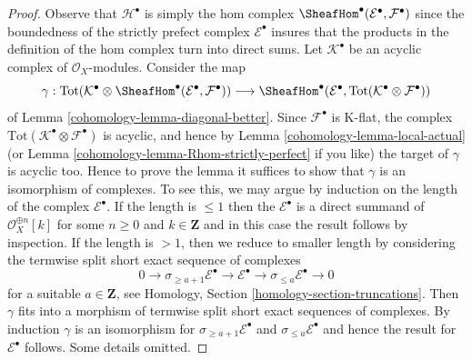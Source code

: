 \begin{proof}

Observe that $\mathcal{H}^\bullet$ is simply the hom complex
$\SheafHom^\bullet(\mathcal{E}^\bullet, \mathcal{F}^\bullet)$
since the boundedness of the strictly prefect complex
$\mathcal{E}^\bullet$ insures that the products in the definition
of the hom complex turn into direct sums.
Let $\mathcal{K}^\bullet$ be an acyclic complex of
$\mathcal{O}_X$-modules. Consider the map
$$
\gamma :
\text{Tot}(\mathcal{K}^\bullet \otimes
\SheafHom^\bullet(\mathcal{E}^\bullet, \mathcal{F}^\bullet))
\longrightarrow
\SheafHom^\bullet(\mathcal{E}^\bullet,
\text{Tot}(\mathcal{K}^\bullet \otimes \mathcal{F}^\bullet))
$$
of Lemma \ref{cohomology-lemma-diagonal-better}. Since $\mathcal{F}^\bullet$ is K-flat,
the complex $\text{Tot}(\mathcal{K}^\bullet \otimes \mathcal{F}^\bullet)$
is acyclic, and hence by Lemma \ref{cohomology-lemma-local-actual}
(or Lemma \ref{cohomology-lemma-Rhom-strictly-perfect} if you like)
the target of $\gamma$ is acyclic too. Hence to prove the lemma it suffices to
show that $\gamma$ is an isomorphism of complexes. To see this, we may argue
by induction on the length of the complex $\mathcal{E}^\bullet$.
If the length is $\leq 1$ then the $\mathcal{E}^\bullet$
is a direct summand of $\mathcal{O}_X^{\oplus n}[k]$ for some
$n \geq 0$ and $k \in \mathbf{Z}$ and in this case the result
follows by inspection. If the length is $> 1$, then we reduce
to smaller length by considering the termwise split short exact
sequence of complexes
$$
0 \to \sigma_{\geq a + 1} \mathcal{E}^\bullet \to
\mathcal{E}^\bullet \to
\sigma_{\leq a} \mathcal{E}^\bullet \to 0
$$
for a suitable $a \in \mathbf{Z}$, see
Homology, Section \ref{homology-section-truncations}.
Then $\gamma$ fits into a morphism of termwise split
short exact sequences of complexes.
By induction $\gamma$ is an isomorphism for
$\sigma_{\geq a + 1} \mathcal{E}^\bullet$
and $\sigma_{\leq a} \mathcal{E}^\bullet$ and hence the result for
$\mathcal{E}^\bullet$ follows. Some details omitted.
\end{proof}

